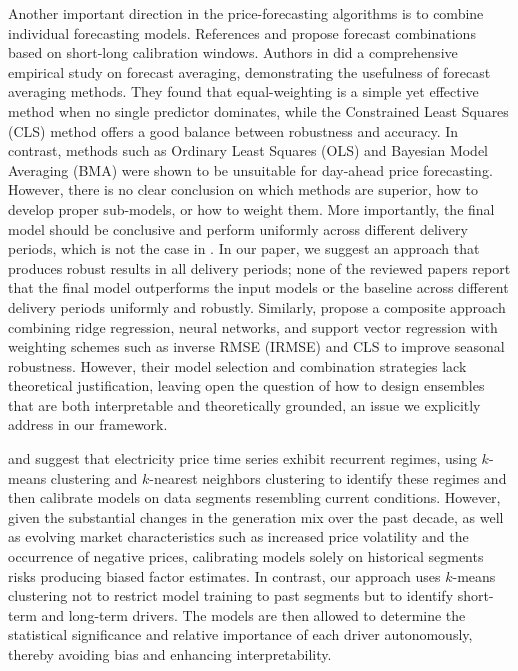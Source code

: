 \documentclass{article}
\begin{document}
Another important direction in the price-forecasting algorithms is to combine individual forecasting models. References \cite{hubicka2018note} and \cite{marcjasz2018selection} propose forecast combinations based on short-long calibration windows. Authors in \cite{nowotarski2014empirical} did a comprehensive empirical study on forecast averaging, demonstrating the usefulness of forecast averaging methods. They found that equal-weighting is a simple yet effective method when no single predictor dominates, while the Constrained Least Squares (CLS) method offers a good balance between robustness and accuracy. In contrast, methods such as Ordinary Least Squares (OLS) and Bayesian Model Averaging (BMA) were shown to be unsuitable for day-ahead price forecasting. However, there is no clear conclusion on which methods are superior, how to develop proper sub-models, or how to weight them. More importantly, the final model should be conclusive and perform uniformly across different delivery periods, which is not the case in \cite{nowotarski2014empirical}. In our paper, we suggest an approach that produces robust results in all delivery periods; none of the reviewed papers report that the final model outperforms the input models or the baseline across different delivery periods uniformly and robustly. Similarly, \citet{MIRAKYAN2017228} propose a composite approach combining ridge regression, neural networks, and support vector regression with weighting schemes such as inverse RMSE (IRMSE) and CLS to improve seasonal robustness. However, their model selection and combination strategies lack theoretical justification, leaving open the question of how to design ensembles that are both interpretable and theoretically grounded, an issue we explicitly address in our framework.

\citet{marcos2020short} and \citet{nitka2021forecasting} suggest that electricity price time series exhibit recurrent regimes, using $k$-means clustering \cite{marcos2020short} and $k$-nearest neighbors clustering \cite{nitka2021forecasting} to identify these regimes and then calibrate models on data segments resembling current conditions. However, given the substantial changes in the generation mix over the past decade, as well as evolving market characteristics such as increased price volatility and the occurrence of negative prices, calibrating models solely on historical segments risks producing biased factor estimates. In contrast, our approach uses $k$-means clustering not to restrict model training to past segments but to identify short-term and long-term drivers. The models are then allowed to determine the statistical significance and relative importance of each driver autonomously, thereby avoiding bias and enhancing interpretability.
\end{document}
